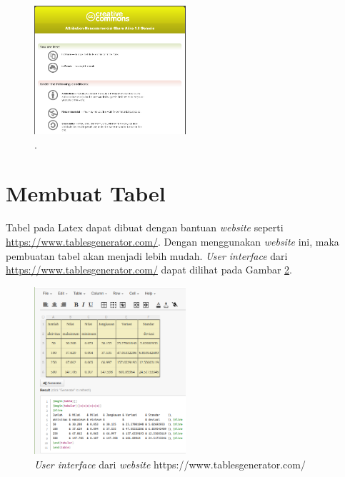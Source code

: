 \begin{figure}
	\centering
	\includegraphics[width=0.50\textwidth]
	{assets/pics/creative_commons.png}
	\caption{\license.}
	\label{fig:testGambar}
\end{figure}


\section{Membuat Tabel}
\label{sec:latexTable}
Tabel pada Latex dapat dibuat dengan bantuan \textit{website} seperti \url{https://www.tablesgenerator.com/}. Dengan menggunakan \textit{website} ini, maka pembuatan tabel akan menjadi lebih mudah. \textit{User interface} dari \url{https://www.tablesgenerator.com/} dapat dilihat pada Gambar \ref{fig:tablesgenerator}.

\begin{figure}
	\centering
	\includegraphics[width=0.5\textwidth]{assets/pics/tablesgenerator-dot-com.png}
	\caption{\textit{User interface} dari \textit{website} https://www.tablesgenerator.com/}
	\label{fig:tablesgenerator}
\end{figure}

